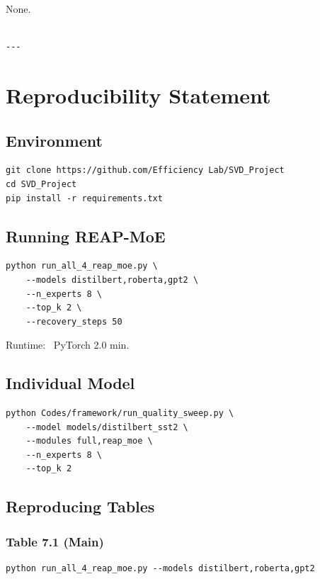None.
\begin{lstlisting}

---
\end{lstlisting}

\section{Reproducibility Statement}

\subsection{Environment}

\begin{lstlisting}
git clone https://github.com/Efficiency Lab/SVD_Project
cd SVD_Project
pip install -r requirements.txt
\end{lstlisting}

\subsection{Running REAP-MoE}

\begin{lstlisting}
python run_all_4_reap_moe.py \
    --models distilbert,roberta,gpt2 \
    --n_experts 8 \
    --top_k 2 \
    --recovery_steps 50
\end{lstlisting}

Runtime: ~PyTorch 2.0 min.

\subsection{Individual Model}

\begin{lstlisting}
python Codes/framework/run_quality_sweep.py \
    --model models/distilbert_sst2 \
    --modules full,reap_moe \
    --n_experts 8 \
    --top_k 2
\end{lstlisting}

\subsection{Reproducing Tables}

\subsubsection{Table 7.1 (Main)}
\begin{lstlisting}
python run_all_4_reap_moe.py --models distilbert,roberta,gpt2
\end{lstlisting}


